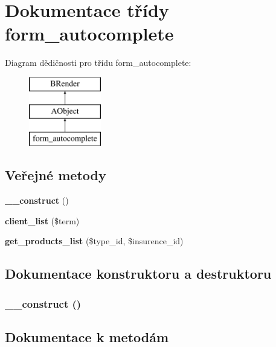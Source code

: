 \section{Dokumentace třídy form\_\-autocomplete}
\label{dc/d05/classform__autocomplete}
Diagram dědičnosti pro třídu form\_\-autocomplete:\begin{figure}[H]
\begin{center}
\leavevmode
\includegraphics[height=3cm]{dc/d05/classform__autocomplete}
\end{center}
\end{figure}
\subsection*{Veřejné metody}
\begin{DoxyCompactItemize}
\item 
{\bf \_\-\_\-construct} ()
\item 
{\bf client\_\-list} (\$term)
\item 
{\bf get\_\-products\_\-list} (\$type\_\-id, \$insurence\_\-id)
\end{DoxyCompactItemize}


\subsection{Dokumentace konstruktoru a destruktoru}
\subsubsection[{\_\-\_\-construct}]{\setlength{\rightskip}{0pt plus 5cm}\_\-\_\-construct ()}\label{dc/d05/classform__autocomplete_a095c5d389db211932136b53f25f39685}


\subsection{Dokumentace k metodám}
